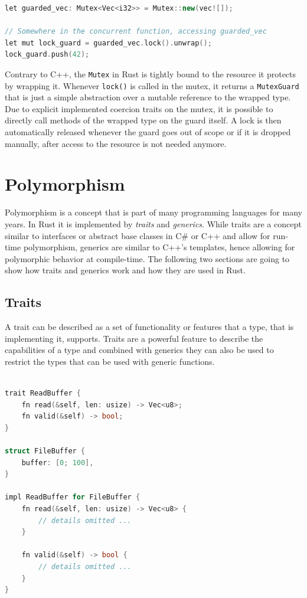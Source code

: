 \begin{lstlisting}[caption={Usage of a std::sync::Mutex to guard a shared resource in Rust}, label={lst:rust_mutex}, language=C++]
let guarded_vec: Mutex<Vec<i32>> = Mutex::new(vec![]);

// Somewhere in the concurrent function, accessing guarded_vec
let mut lock_guard = guarded_vec.lock().unwrap();
lock_guard.push(42);
\end{lstlisting}

\noindent
Contrary to C++, the \texttt{Mutex} in Rust is tightly bound to the resource it protects by wrapping it. Whenever \texttt{lock()} is called in the mutex, it returns a \texttt{MutexGuard} that is just a simple abstraction over a mutable reference to the wrapped type. Due to explicit implemented coercion traits on the mutex, it is possible to directly call methods of the wrapped type on the guard itself. A lock is then automatically released whenever the guard goes out of scope or if it is dropped manually, after access to the resource is not needed anymore.

\section{Polymorphism}

Polymorphism is a concept that is part of many programming languages for many years. In Rust it is implemented by \textit{traits} and \textit{generics}. While traits are a concept similar to interfaces or abstract base classes in C\# or C++ and allow for run-time polymorphism, generics are similar to C++'s templates, hence allowing for polymorphic behavior at compile-time. The following two sections are going to show how traits and generics work and how they are used in Rust.

\subsection{Traits}

A trait can be described as a set of functionality or features that a type, that is implementing it, supports. Traits are a powerful feature to describe the capabilities of a type and combined with generics they can also be used to restrict the types that can be used with generic functions.\\

\begin{lstlisting}[caption={Example usage of a trait and a type implementing it}, label={lst:rust_trait}, language=C++]

trait ReadBuffer {
	fn read(&self, len: usize) -> Vec<u8>;
	fn valid(&self) -> bool; 
}

struct FileBuffer {
	buffer: [0; 100],
}

impl ReadBuffer for FileBuffer {
	fn read(&self, len: usize) -> Vec<u8> {
		// details omitted ...
	}
	
	fn valid(&self) -> bool {
		// details omitted ...
	}
}
\end{lstlisting}

